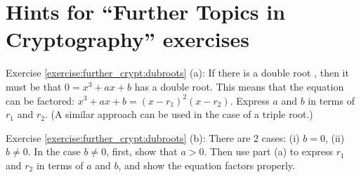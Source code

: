 \section{Hints for ``Further  Topics in Cryptography'' exercises}\label{sec:further_crypt:hints}

\noindent Exercise \ref{exercise:further_crypt:dubroots} (a):  If there is a double root , then it must be that $0 = x^3 + ax + b$ has a double root. This means that the equation can be factored:  $x^3 + ax+b = (x-r_1)^2(x-r_2)$.  Express $a$ and $b$ in terms of $r_1$ and $r_2$.  (A similar approach can be used in the case of a triple root.)  

\noindent Exercise \ref{exercise:further_crypt:dubroots} (b):  There are 2 cases: (i) $b=0$, (ii) $b \neq 0$. In the case $b \neq 0$, first, show that $a > 0$.  Then use part (a) to express $r_1$ and $r_2$ in terms of $a$ and $b$, and show the equation factors properly.

